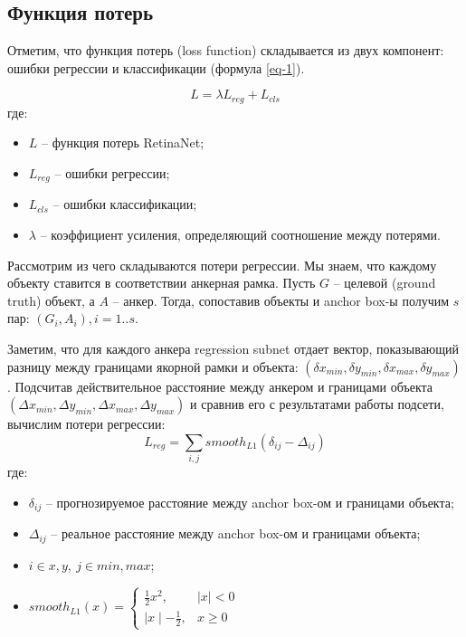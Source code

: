 \subsection{Функция потерь}

Отметим, что функция потерь (loss function) складывается из двух компонент: ошибки регрессии и классификации (формула \ref{eq-1}).

\begin{equation}\label{eq-1}
    L = \lambda L_{reg}+L_{cls}
\end{equation}
где:
\begin{itemize}
    \item $L$ -- функция потерь RetinaNet;
    \item $L_{reg}$ -- ошибки регрессии;
    \item $L_{cls}$ -- ошибки классификации;
    \item $\lambda$ -- коэффициент усиления, определяющий соотношение между потерями.
\end{itemize}

Рассмотрим из чего складываются потери регрессии. Мы знаем, что каждому объекту ставится в соответствии анкерная рамка. Пусть $G$ -- целевой (ground truth) объект, а $A$ -- анкер. Тогда, сопоставив объекты и anchor box-ы получим $s$ пар: $(G_i, A_i), i=1..s$.

Заметим, что для каждого анкера regression subnet отдает вектор, показывающий разницу между границами якорной рамки и объекта: $(\delta x_{min}, \delta y_{min}, \delta x_{max}, \delta y_{max})$.  Подсчитав действительное расстояние между анкером и границами объекта  $(\Delta x_{min}, \Delta y_{min}, \Delta x_{max}, \Delta y_{max})$ и сравнив его с результатами работы подсети, вычислим потери регрессии:
$$
L_{reg} = \sum_{i, j} smooth_{L1}(\delta_{ij}-\Delta_{ij})
$$
где:
\begin{itemize}
    \item $\delta_{ij}$ -- прогнозируемое расстояние между anchor box-ом и границами объекта;
    \item $\Delta_{ij}$ -- реальное расстояние между anchor box-ом и границами объекта;
    \item $i \in {x, y},\ j \in {min, max}$;
    \item $smooth_{L1}(x) = \begin{cases}\frac{1}{2}x^2, & \mid x\mid < 0\\\mid x\mid - \frac{1}{2}, & x \geq 0\end{cases}$
\end{itemize}

